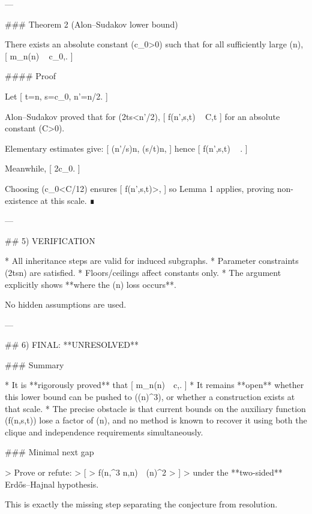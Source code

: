---

### Theorem 2 (Alon–Sudakov lower bound)

There exists an absolute constant (c_0>0) such that for all sufficiently large (n),
[
m_n(\lceil\log n\rceil)
\ \ge
c_0,.
]

#### Proof

Let
[
t=\lceil\log n\rceil,
\qquad
s=\left\lfloor c_0\right\rfloor,
\qquad
n'=\lfloor n/2\rfloor.
]

Alon–Sudakov proved that for (2t\le s<n'/2),
[
f(n',s,t)
\ \ge
C,t
]
for an absolute constant (C>0).

Elementary estimates give:
[
\log(n'/s)\ge {}\log n,
\qquad
\log(s/t)\log\log n,
]
hence
[
f(n',s,t)
\ \ge
{}.
]

Meanwhile,
[
\le
2c_0.
]

Choosing (c_0<C/12) ensures
[
f(n',s,t)>,
]
so Lemma 1 applies, proving non-existence at this scale. ∎

---

## 5) VERIFICATION

* All inheritance steps are valid for induced subgraphs.
* Parameter constraints (2t\le s\ll n) are satisfied.
* Floors/ceilings affect constants only.
* The argument explicitly shows **where the (\log\log n) loss occurs**.

No hidden assumptions are used.

---

## 6) FINAL: **UNRESOLVED**

### Summary

* It is **rigorously proved** that
  [
  m_n(\log n)\ \ge\ c,.
  ]
* It remains **open** whether this lower bound can be pushed to ((\log n)^3), or whether a construction exists at that scale.
* The precise obstacle is that current bounds on the auxiliary function (f(n,s,t)) lose a factor of (\log\log n), and no method is known to recover it using both the clique and independence requirements simultaneously.

### Minimal next gap

> Prove or refute:
> [
> f(n,\log^3 n,\log n)\ \gg\ (\log n)^2
> ]
> under the **two-sided** Erdős–Hajnal hypothesis.

This is exactly the missing step separating the conjecture from resolution.

